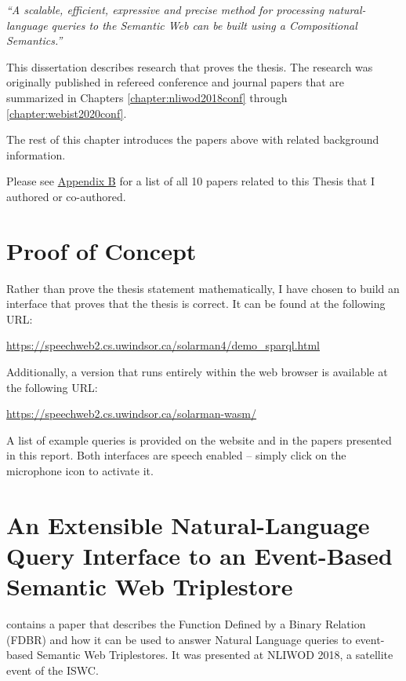 \documentclass[../main.tex]{subfiles}
\begin{document}
\begin{refsection}
\vspace{0.5em}

\textit{``A scalable, efficient, expressive and precise method for processing natural-language queries to the Semantic Web can be built using a Compositional Semantics.''}

\vspace{0.5em}

This dissertation describes research that proves the thesis. The research was originally published in refereed conference and journal papers that are summarized in Chapters \ref{chapter:nliwod2018conf} through \ref{chapter:webist2020conf}.

The rest of this chapter introduces the papers above with related background information.

Please see \hyperref[appendix:b]{Appendix B} for a list of all 10 papers related to this Thesis that I authored or co-authored.

\section{Proof of Concept}

Rather than prove the thesis statement mathematically, I have chosen to build an interface that
proves that the thesis is correct.  It can be found at the following URL:

\begin{center}
    \url{https://speechweb2.cs.uwindsor.ca/solarman4/demo_sparql.html}
\end{center}
Additionally, a version that runs entirely within the web browser is available at
the following URL:
\begin{center}
    \url{https://speechweb2.cs.uwindsor.ca/solarman-wasm/}
\end{center}
A list of example queries is provided on the website and in the papers presented in this report.
Both interfaces are speech enabled -- simply click on the microphone icon to activate it.

\section{An Extensible Natural-Language Query Interface to an Event-Based Semantic Web Triplestore}

\textbf{} contains a paper that describes the Function Defined by a Binary Relation (FDBR) and how it can be used to answer Natural Language queries to event-based Semantic Web Triplestores.  It was presented at NLIWOD 2018, a satellite event of the ISWC.


\end{refsection}
\end{document}
